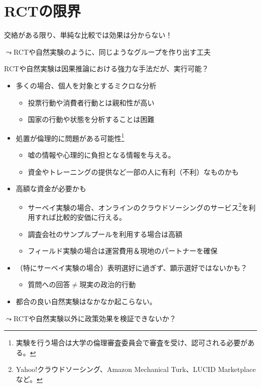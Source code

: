 \documentclass[
  xelatex,
  ja=standard]{bxjsarticle}
\providecommand{\tightlist}{%
  \setlength{\itemsep}{0pt}\setlength{\parskip}{0pt}}\usepackage{longtable,booktabs,array}
\begin{document}
\hypertarget{rctux306eux9650ux754c}{%
\section{RCTの限界}\label{rctux306eux9650ux754c}}

交絡がある限り、単純な比較では効果は分からない！

\(\leadsto\)RCTや自然実験のように、同じようなグループを作り出す工夫

RCTや自然実験は因果推論における強力な手法だが、実行可能？

\begin{itemize}
\tightlist
\item
  多くの場合、個人を対象とするミクロな分析

  \begin{itemize}
  \tightlist
  \item
    投票行動や消費者行動とは親和性が高い
  \item
    国家の行動や状態を分析することは困難
  \end{itemize}
\item
  処置が倫理的に問題がある可能性\footnote{実験を行う場合は大学の倫理審査委員会で審査を受け、認可される必要がある。}

  \begin{itemize}
  \tightlist
  \item
    嘘の情報や心理的に負担となる情報を与える。
  \item
    資金やトレーニングの提供など一部の人に有利（不利）なものかも
  \end{itemize}
\item
  高額な資金が必要かも

  \begin{itemize}
  \tightlist
  \item
    サーベイ実験の場合、オンラインのクラウドソーシングのサービス\footnote{Yahoo!クラウドソーシング、Amazon
      Mechanical Turk、LUCID Marketplaceなど。}を利用すれば比較的安価に行える。
  \item
    調査会社のサンプルプールを利用する場合は高額
  \item
    フィールド実験の場合は運営費用＆現地のパートナーを確保
  \end{itemize}
\item
  （特にサーベイ実験の場合）表明選好に過ぎず、顕示選好ではないかも？

  \begin{itemize}
  \tightlist
  \item
    質問への回答\(\neq\)現実の政治的行動
  \end{itemize}
\item
  都合の良い自然実験はなかなか起こらない。
\end{itemize}

\(\leadsto\)RCTや自然実験以外に政策効果を検証できないか？


  
\end{document}
